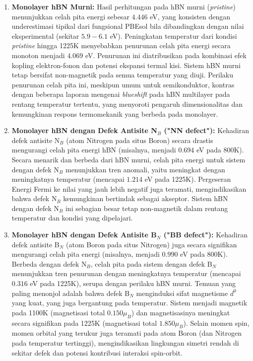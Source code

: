 \begin{enumerate}
    \item \textbf{Monolayer hBN Murni:}
    Hasil perhitungan pada hBN murni (\textit{pristine}) menunjukkan celah pita energi sebesar $4.446$ eV, yang konsisten dengan underestimasi tipikal dari fungsional PBEsol bila dibandingkan dengan nilai eksperimental (sekitar $5.9-6.1$ eV). Peningkatan temperatur dari kondisi \textit{pristine} hingga 1225K menyebabkan penurunan celah pita energi secara monoton menjadi $4.069$ eV. Penurunan ini diatribusikan pada kombinasi efek kopling elektron-fonon dan potensi ekspansi termal kisi. Sistem hBN murni tetap bersifat non-magnetik pada semua temperatur yang diuji. Perilaku penurunan celah pita ini, meskipun umum untuk semikonduktor, kontras dengan beberapa laporan mengenai \textit{blueshift} pada hBN multilayer pada rentang temperatur tertentu, yang menyoroti pengaruh dimensionalitas dan kemungkinan respons termomekanik yang berbeda pada monolayer.

    \item \textbf{Monolayer hBN dengan Defek Antisite N$_B$ ("NN defect"):}
    Kehadiran defek antisite N$_B$ (atom Nitrogen pada situs Boron) secara drastis mengurangi celah pita energi hBN (misalnya, menjadi $0.694$ eV pada 800K). Secara menarik dan berbeda dari hBN murni, celah pita energi untuk sistem dengan defek N$_B$ menunjukkan tren anomali, yaitu meningkat dengan meningkatnya temperatur (mencapai $1.214$ eV pada 1225K). Pergeseran Energi Fermi ke nilai yang jauh lebih negatif juga teramati, mengindikasikan bahwa defek N$_B$ kemungkinan bertindak sebagai akseptor. Sistem hBN dengan defek N$_B$ ini sebagian besar tetap non-magnetik dalam rentang temperatur dan kondisi yang dipelajari.

    \item \textbf{Monolayer hBN dengan Defek Antisite B$_N$ ("BB defect"):}
    Kehadiran defek antisite B$_N$ (atom Boron pada situs Nitrogen) juga secara signifikan mengurangi celah pita energi (misalnya, menjadi $0.990$ eV pada 800K). Berbeda dengan defek N$_B$, celah pita pada sistem dengan defek B$_N$ menunjukkan tren penurunan dengan meningkatnya temperatur (mencapai $0.316$ eV pada 1225K), serupa dengan perilaku hBN murni. Temuan yang paling menonjol adalah bahwa defek B$_N$ menginduksi sifat magnetisme $d^0$ yang kuat, yang juga bergantung pada temperatur. Sistem menjadi magnetik pada 1100K (magnetisasi total $0.150 \mu_B$) dan magnetisasinya meningkat secara signifikan pada 1225K (magnetisasi total $1.850 \mu_B$). Selain momen spin, momen orbital yang terukur juga teramati pada atom Boron (dan Nitrogen pada temperatur tertinggi), mengindikasikan lingkungan simetri rendah di sekitar defek dan potensi kontribusi interaksi spin-orbit.
\end{enumerate}

